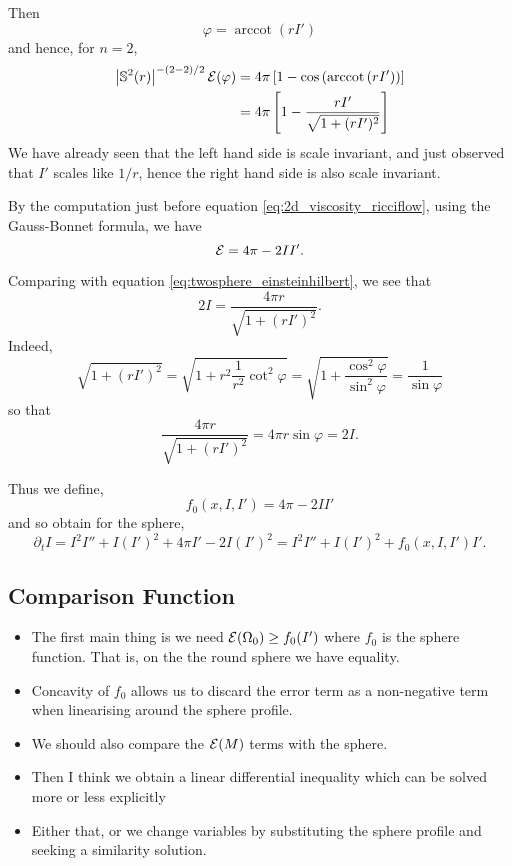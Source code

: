 \documentclass{amsart}
\begin{document}
Then
\[
\varphi = \operatorname{arccot}\left(r I'\right)
\]
and hence, for \(n=2\),
\begin{equation}
\label{eq:twosphere_einsteinhilbert}
\begin{split}
\left|{\mathbb{S}^2(r)}\right|^{-(2-2)/2} \operatorname{\mathcal{E}}(\varphi) &= 4\pi \left[1 - \cos\left(\operatorname{arccot}\left(r I'\right)\right)\right] \\
&= 4\pi \left[1 - \frac{r I'}{\sqrt{1 + (r I')^2}}\right]
\end{split}
\end{equation}
We have already seen that the left hand side is scale invariant, and just observed that \(I'\) scales like \(1/r\), hence the right hand side is also scale invariant.

By the computation just before equation \eqref{eq:2d_viscosity_ricciflow}, using the Gauss-Bonnet formula, we have
\[
\operatorname{\mathcal{E}} = 4\pi - 2II'.
\]

Comparing with equation \eqref{eq:twosphere_einsteinhilbert}, we see that
\[
2I = \frac{4\pi r}{\sqrt{1 + (r I')^2}}.
\]
Indeed,
\[
\sqrt{1 + (r I')^2} = \sqrt{1 + r^2 \frac{1}{r^2} \cot^2 \varphi} = \sqrt{1 + \frac{\cos^2\varphi}{\sin^2\varphi}} = \frac{1}{\sin\varphi}
\]
so that
\[
\frac{4\pi r}{\sqrt{1 + (r I')^2}} = 4\pi r \sin \varphi = 2I.
\]

Thus we define,
\[
f_0(x, I, I') = 4\pi - 2II'
\]
and so obtain for the sphere,
\[
\partial_t I = I^2I'' + I(I')^2 + 4\pi I' - 2I(I')^2 = I^2I'' + I(I')^2 + f_0(x, I, I') I'.
\]
\subsection{Comparison Function}

\begin{itemize}
\item The first main thing is we need \(\operatorname{\mathcal{E}}(\Omega_0) \geq f_0(I')\) where \(f_0\) is the sphere function. That is, on the the round sphere we have equality.
\item Concavity of \(f_0\) allows us to discard the error term as a non-negative term when linearising around the sphere profile.
\item We should also compare the \(\operatorname{\mathcal{E}}(M)\) terms with the sphere.
\item Then I think we obtain a linear differential inequality which can be solved more or less explicitly
\item Either that, or we change variables by substituting the sphere profile and seeking a similarity solution.
\end{itemize}
\end{document}
